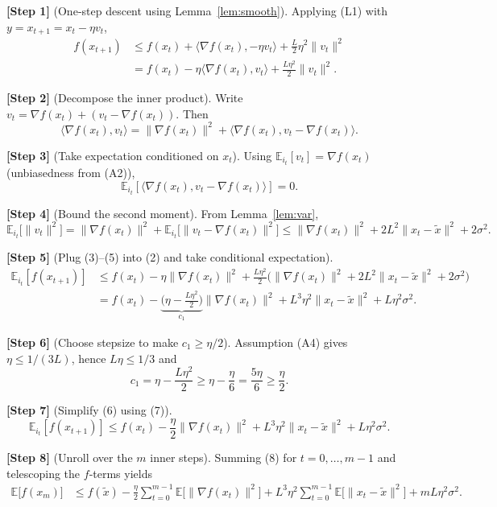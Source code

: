 \documentclass{article}
\newcommand{\E}{\mathbb{E}}
\begin{document}
\bigskip
\noindent\textbf{[Step 1]} (One‑step descent using Lemma~\ref{lem:smooth}).  
Applying (L1) with $y=x_{t+1}=x_t-\eta v_t$,
\[
\begin{aligned}
f(x_{t+1})
&\le f(x_t)+\langle\nabla f(x_t), -\eta v_t\rangle
   +\frac{L}{2}\eta^{2}\|v_t\|^{2} \\
&= f(x_t)-\eta\langle\nabla f(x_t),v_t\rangle
   +\frac{L\eta^{2}}{2}\|v_t\|^{2}. \tag{2}
\end{aligned}
\]

\noindent\textbf{[Step 2]} (Decompose the inner product).  
Write $v_t = \nabla f(x_t) + (v_t-\nabla f(x_t))$. Then
\[
\langle\nabla f(x_t),v_t\rangle
= \|\nabla f(x_t)\|^{2}
  +\langle\nabla f(x_t),v_t-\nabla f(x_t)\rangle. \tag{3}
\]

\noindent\textbf{[Step 3]} (Take expectation conditioned on $x_t$).  
Using $\E_{i_t}[v_t]=\nabla f(x_t)$ (unbiasedness from (A2)),
\[
\E_{i_t}[\langle\nabla f(x_t),v_t-\nabla f(x_t)\rangle]=0. \tag{4}
\]

\noindent\textbf{[Step 4]} (Bound the second moment).  
From Lemma~\ref{lem:var},
\[
\E_{i_t}\big[\|v_t\|^{2}\big]
= \|\nabla f(x_t)\|^{2}
  +\E_{i_t}\big[\|v_t-\nabla f(x_t)\|^{2}\big]
\le \|\nabla f(x_t)\|^{2}+2L^{2}\|x_t-\tilde{x}\|^{2}+2\sigma^{2}. \tag{5}
\]

\noindent\textbf{[Step 5]} (Plug (3)–(5) into (2) and take conditional expectation).  
\[
\begin{aligned}
\E_{i_t}[f(x_{t+1})]
&\le f(x_t)-\eta\|\nabla f(x_t)\|^{2}
   +\frac{L\eta^{2}}{2}\Big(\|\nabla f(x_t)\|^{2}
   +2L^{2}\|x_t-\tilde{x}\|^{2}+2\sigma^{2}\Big) \\
&= f(x_t)-\underbrace{\Big(\eta-\frac{L\eta^{2}}{2}\Big)}_{c_1}\|\nabla f(x_t)\|^{2}
   +L^{3}\eta^{2}\|x_t-\tilde{x}\|^{2}
   +L\eta^{2}\sigma^{2}. \tag{6}
\end{aligned}
\]

\noindent\textbf{[Step 6]} (Choose stepsize to make $c_1\ge \eta/2$).  
Assumption (A4) gives $\eta\le 1/(3L)$, hence $L\eta\le 1/3$ and
\[
c_1=\eta-\frac{L\eta^{2}}{2}\ge \eta-\frac{\eta}{6}= \frac{5\eta}{6}\ge\frac{\eta}{2}. \tag{7}
\]

\noindent\textbf{[Step 7]} (Simplify (6) using (7)).  
\[
\E_{i_t}[f(x_{t+1})]
\le f(x_t)-\frac{\eta}{2}\|\nabla f(x_t)\|^{2}
   +L^{3}\eta^{2}\|x_t-\tilde{x}\|^{2}
   +L\eta^{2}\sigma^{2}. \tag{8}
\]

\noindent\textbf{[Step 8]} (Unroll over the $m$ inner steps).  
Summing (8) for $t=0,\dots,m-1$ and telescoping the $f$‑terms yields
\[
\begin{aligned}
\E\!\big[f(x_{m})\big]
&\le f(\tilde{x})-\frac{\eta}{2}\sum_{t=0}^{m-1}\E\!\big[\|\nabla f(x_t)\|^{2}\big]
   +L^{3}\eta^{2}\sum_{t=0}^{m-1}\E\!\big[\|x_t-\tilde{x}\|^{2}\big]
   +mL\eta^{2}\sigma^{2}. \tag{9}
\end{aligned}
\]
\end{document}
